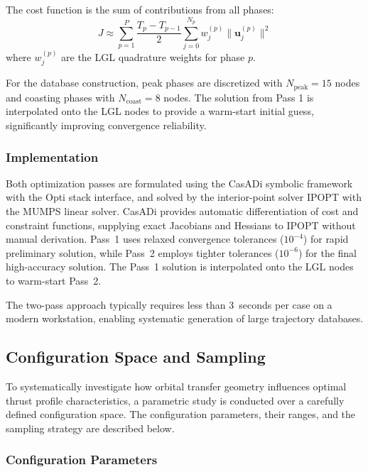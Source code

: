 \documentclass[a4paper,fleqn]{cas-dc}
\let\origsubsection\subsection
\renewcommand{\subsection}{\FloatBarrier\origsubsection}
\begin{document}
The cost function is the sum of contributions from all phases:
\begin{equation}
J \approx \sum_{p=1}^{P} \frac{T_p - T_{p-1}}{2} \sum_{j=0}^{N_p} w_j^{(p)} \|\mathbf{u}_j^{(p)}\|^2
\end{equation}
where $w_j^{(p)}$ are the LGL quadrature weights for phase $p$.

For the database construction, peak phases are discretized with $N_{\text{peak}} = 15$ nodes and coasting phases with $N_{\text{coast}} = 8$ nodes. The solution from Pass 1 is interpolated onto the LGL nodes to provide a warm-start initial guess, significantly improving convergence reliability.

\subsubsection{Implementation}

Both optimization passes are formulated using the CasADi symbolic framework \citep{Andersson2019} with the Opti stack interface, and solved by the interior-point solver IPOPT \citep{Waechter2006} with the MUMPS linear solver. CasADi provides automatic differentiation of cost and constraint functions, supplying exact Jacobians and Hessians to IPOPT without manual derivation. Pass~1 uses relaxed convergence tolerances ($10^{-4}$) for rapid preliminary solution, while Pass~2 employs tighter tolerances ($10^{-6}$) for the final high-accuracy solution. The Pass~1 solution is interpolated onto the LGL nodes to warm-start Pass~2.

The two-pass approach typically requires less than 3~seconds per case on a modern workstation, enabling systematic generation of large trajectory databases.

\subsection{Configuration Space and Sampling}\label{subsec:configuration}

To systematically investigate how orbital transfer geometry influences optimal thrust profile characteristics, a parametric study is conducted over a carefully defined configuration space. The configuration parameters, their ranges, and the sampling strategy are described below.

\subsubsection{Configuration Parameters}
\end{document}
